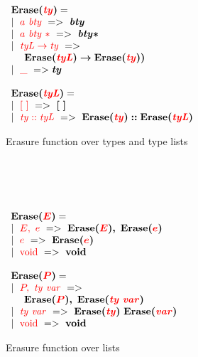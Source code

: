 \begin{figure*}
\begin{minipage}{0.4\textwidth}
\\ \\ \\
\begin{subfigure}{\textwidth}
$\begin{array}{l}
\bm{\erasure(\rType)} =  \\  	
	\mid\ \rlabel\ \rbtype\ =>\ \bm{\btype}  \\ 
	\mid\ \RT{\rlabel\ \rbtype\ *}\ =>\ \bm{\btype*}  \\ 
	\mid\ \RT{\Tlist \to \rType}\ =>\ \\ \ \quad \bm{\erasure(\RT{\Tlist}) \to \erasure(\rType))}  \\ 
	\mid\ \RT\_\ => \bm{\Type} \\ \\
\bm{\erasure(\rTlist)} =  \\ 
	\mid\ \RT{[\ ]}\ =>\ \bm{[\ ]}  \\ 
	\mid\ \RT{\Type::\Tlist}\ =>\ \bm{\erasure(\RT{\Type})::\erasure(\RT{\Tlist})} 
\end{array}$
\caption{Erasure function over types and type lists} 	\label{Fig: erasure ty}
\end{subfigure}
\\ \\ \\
\begin{subfigure}{\textwidth} 
$\begin{array}{l}
\bm{\erasure(\rElist)} = \\ 
	\mid\ \RT{\Elist,\ \Expr}\ =>\ \bm{\erasure(\RT{\Elist}),\ \erasure(\rExpr)}  \\ 
	\mid\ \rExpr\ =>\ \bm{\erasure(\rExpr)}  \\ 
	\mid\ \rVoid\ =>\ \bm{\Void} \\  \\
\bm{\erasure(\rplist)} =  \\ 
	\mid\ \RT{\plist,\ \Type\ \var}\ =>\ \\ \ \quad \bm{\erasure(\RT{\plist}),\ \erasure(\RT{\Type\ \var})}  \\ 
	\mid\ \RT{\Type\ \var}\ =>\ \bm{\erasure(\rType)\ \erasure(\RT\var)}  \\ 
	\mid\ \rVoid\ =>\ \bm{\Void}
\end{array}$
\caption{Erasure function over lists} 	\label{Fig: erasure list}
\end{subfigure}
\end{minipage}
\\ \\ \\

\end{figure*}

